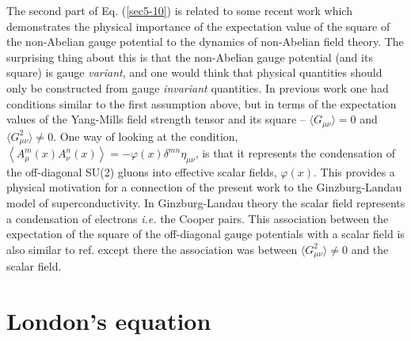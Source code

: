 \documentclass[a4paper,aps,showpacs]{revtex4}
\begin{document}
The second part of Eq. (\ref{sec5-10}) is related to some
recent work \cite{gubarev} \cite{kondo2} which demonstrates the
physical importance of the expectation value of the square of the
non-Abelian gauge potential to the dynamics of non-Abelian field
theory. The surprising thing about this is that the non-Abelian
gauge potential (and its square)
is gauge {\it variant}, and one would think that
physical quantities should only be constructed from gauge
{\it invariant} quantities. In previous work \cite{amb}
\cite{cw} \cite{cw1} one had conditions similar to the first
assumption above, but in terms of the expectation values of
the Yang-Mills field strength tensor and its square --
$\langle G_{\mu \nu} \rangle =0$ and
$\langle G_{\mu \nu}^2 \rangle \neq 0$.
One way of looking at the condition,
$\left\langle A^m_\mu (x) A^n_\nu (x) \right\rangle =
- \varphi (x) \delta ^{mn} \eta _{\mu\nu}$, is that it represents
the condensation of the off-diagonal SU(2) gluons into
effective scalar fields, $\varphi (x)$. This provides a physical
motivation for a connection of the present work to
the Ginzburg-Landau model of superconductivity. In
Ginzburg-Landau theory the scalar field represents a
condensation of electrons {\it i.e.} the Cooper pairs.
This association between the expectation of the square
of the off-diagonal gauge potentials with a scalar field
is also similar to ref. \cite{cw} except
there the association was between $\langle G_{\mu \nu}^2 \rangle \neq 0$
and the scalar field.


\section{London's equation}
\end{document}

